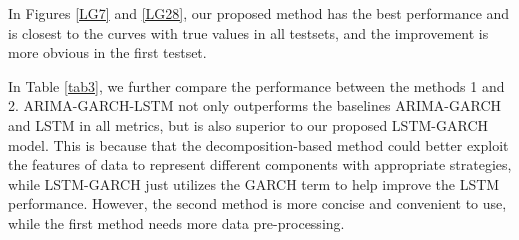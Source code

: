 




In Figures \ref{LG7} and \ref{LG28},  our proposed method has the best performance and is closest to the curves with true values in all testsets,  and the improvement is more obvious in the first testset.

In Table \ref{tab3}, we further compare the performance between the methods 1 and 2.  ARIMA-GARCH-LSTM not only outperforms the baselines ARIMA-GARCH and LSTM in all metrics, but  is also superior to our proposed  LSTM-GARCH model. This is because that the decomposition-based method could better exploit the features of data to represent different components with appropriate strategies,  while LSTM-GARCH just utilizes the GARCH term to help improve the LSTM performance. However, the second method is more concise and convenient to use, while the first method needs more data pre-processing.%



